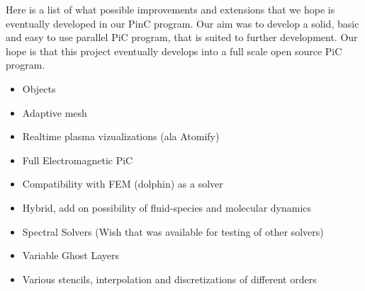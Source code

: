Here is a list of what possible improvements and extensions that we hope
is eventually developed in our PinC program. Our aim was to develop a solid, basic
and easy to use parallel PiC program, that is suited to further development. Our hope
is that this project eventually develops into a full scale open source PiC program.

\begin{itemize}
    \item Objects
    \item Adaptive mesh
    \item Realtime plasma vizualizations (ala Atomify)
    \item Full Electromagnetic PiC
    \item Compatibility with FEM (dolphin) as a solver
    \item Hybrid, add on possibility of fluid-species and molecular dynamics
    \item Spectral Solvers (Wish that was available for testing of other solvers)
    \item Variable Ghost Layers
    \item Various stencils, interpolation and discretizations of different orders
\end{itemize}
